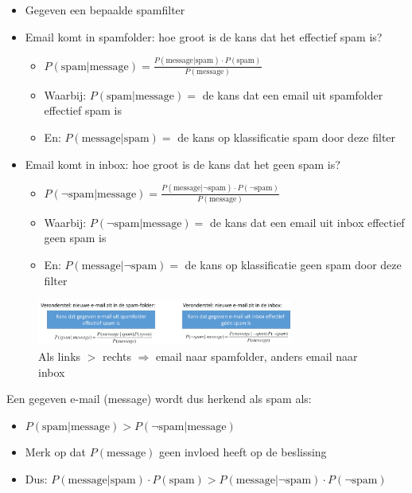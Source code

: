 \documentclass{article}
\begin{document}
\begin{itemize}
    \item Gegeven een bepaalde spamfilter
    \item Email komt in spamfolder: hoe groot is de kans dat het effectief spam is?
    \begin{itemize}
        \item $P(\text{spam} | \text{message}) = \frac{P(\text{message}|\text{spam}) \cdot P(\text{spam})}{P(\text{message})}$
        \item Waarbij: $P(\text{spam} | \text{message})=$ de kans dat een email uit spamfolder effectief spam is
        \item En: $P(\text{message}|\text{spam})=$ de kans op klassificatie spam door deze filter
    \end{itemize}
    \item Email komt in inbox: hoe groot is de kans dat het geen spam is?
    \begin{itemize}
        \item $P(\neg \text{spam} | \text{message}) = \frac{P(\text{message}|\neg \text{spam}) \cdot P(\neg \text{spam})}{P(\text{message})}$
        \item Waarbij: $P(\neg \text{spam} | \text{message})=$ de kans dat een email uit inbox effectief geen spam is
        \item En: $P(\text{message}| \neg \text{spam})=$ de kans op klassificatie geen spam door deze filter
    \end{itemize}
\end{itemize}

\begin{figure}[H]
    \centering
    \includegraphics[width=0.75\textwidth]{bayes-spam.png}
    \caption{Als links $>$ rechts $\Rightarrow$ email naar spamfolder, anders email naar inbox}
\end{figure}

Een gegeven e-mail (message) wordt dus herkend als spam als:

\begin{itemize}
    \item $P(\text{spam} | \text{message}) > P(\neg \text{spam} | \text{message})$
    \item Merk op dat $P(\text{message})$ geen invloed heeft op de beslissing
    \item Dus: $P(\text{message}|\text{spam}) \cdot P(\text{spam}) > P(\text{message}|\neg \text{spam}) \cdot P(\neg \text{spam})$
\end{itemize}
\end{document}
